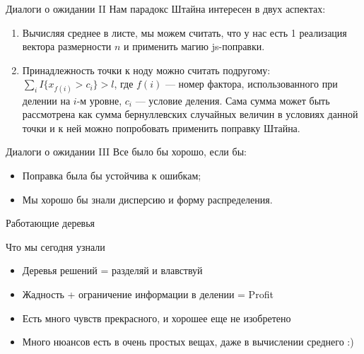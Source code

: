 \documentclass[14pt, fleqn, xcolor={dvipsnames, table}]{beamer}
\begin{document}
\begin{frame}{Диалоги о ожидании II} 
Нам парадокс Штайна интересен в двух аспектах:
\begin{enumerate}
  \item Вычисляя среднее в листе, мы можем считать, что у нас есть 1 реализация вектора размерности $n$ и применить магию js-поправки.
  \item Принадлежность точки к ноду можно считать подругому: $\sum_i I\{x_{f(i)} > c_i\} > l$, где $f(i)$ --- номер фактора, использованного при делении на $i$-м уровне, $c_i$ --- условие деления. Сама сумма может быть рассмотрена как сумма бернуллевских случайных величин в условиях данной точки и к ней можно попробовать применить поправку Штайна.
\end{enumerate}
\end{frame}

\begin{frame}{Диалоги о ожидании III} %
Все было бы хорошо, если бы:
\begin{itemize}
  \item Поправка была бы устойчива к ошибкам; %
  \item Мы хорошо бы знали дисперсию и форму распределения.
\end{itemize}
\end{frame}

\begin{frame}{Работающие деревья}
\large
\center
{}
\end{frame}


\begin{frame}{Что мы сегодня узнали}
\begin{itemize}
  \item Деревья решений = разделяй и влавствуй
  \item Жадность + ограничение информации в делении = Profit
  \item Есть много чувств прекрасного, и хорошее еще не изобретено
  \item Много нюансов есть в очень простых вещах, даже в вычислении среднего :)
\end{itemize}
\end{frame}
\end{document}

